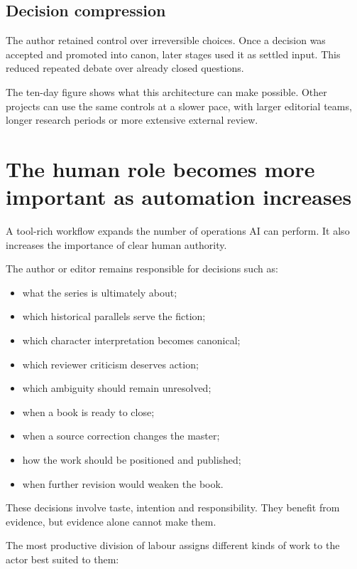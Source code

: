 \documentclass[11pt,oneside,openany]{book}
\providecommand{\tightlist}{%
  \setlength{\itemsep}{0pt}\setlength{\parskip}{0pt}}
\begin{document}
\section{Decision compression}\label{decision-compression}

The author retained control over irreversible choices. Once a decision was accepted and promoted into canon, later stages used it as settled input. This reduced repeated debate over already closed questions.

The ten-day figure shows what this architecture can make possible. Other projects can use the same controls at a slower pace, with larger editorial teams, longer research periods or more extensive external review.

\chapter{The human role becomes more important as automation increases}\label{the-human-role-becomes-more-important-as-automation-increases}

A tool-rich workflow expands the number of operations AI can perform. It also increases the importance of clear human authority.

The author or editor remains responsible for decisions such as:

\begin{itemize}
\tightlist
\item
  what the series is ultimately about;
\item
  which historical parallels serve the fiction;
\item
  which character interpretation becomes canonical;
\item
  which reviewer criticism deserves action;
\item
  which ambiguity should remain unresolved;
\item
  when a book is ready to close;
\item
  when a source correction changes the master;
\item
  how the work should be positioned and published;
\item
  when further revision would weaken the book.
\end{itemize}

These decisions involve taste, intention and responsibility. They benefit from evidence, but evidence alone cannot make them.

The most productive division of labour assigns different kinds of work to the actor best suited to them:
\end{document}

